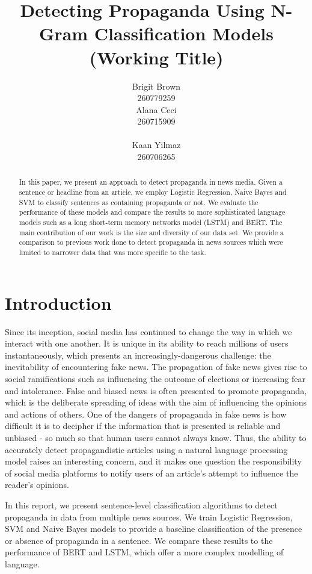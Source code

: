 \documentclass[11pt]{article}
\title{Detecting Propaganda Using N-Gram Classification Models (Working Title)}
\author{Brigit Brown \\
260779259 \\\And
 Alana Ceci \\
  260715909 \\
  \\\And
  Kaan Yilmaz \\
  260706265}
\date{}
\begin{document}
\maketitle
\begin{abstract}

In this paper, we present an approach to detect propaganda in news media. Given a sentence or headline from an article, we employ Logistic Regression, Naive Bayes and SVM to classify sentences as containing propaganda or not. We evaluate the performance of these models and compare the results to more sophisticated language models such as a long short-term memory networks model (LSTM) and BERT. The main contribution of our work is the size and diversity of our data set. We provide a comparison to previous work done to detect propaganda in news sources which were limited to narrower data that was more specific to the task. 
\end{abstract}

\section{Introduction}

Since its inception, social media has continued to change the way in which we interact with one another.  It is unique in its ability to reach millions of users instantaneously, which presents an increasingly-dangerous challenge: the inevitability of encountering fake news. The propagation of fake news gives rise to social ramifications such as influencing the outcome of elections or increasing fear and intolerance. False and biased news is often presented to promote propaganda, which is the deliberate spreading of ideas with the aim of influencing the opinions and actions of others. One of the dangers of propaganda in fake news is how difficult it is to decipher if the information that is presented is reliable and unbiased - so much so that human users cannot always know. Thus, the ability to accurately detect propagandistic articles using a natural language processing model raises an interesting concern, and it makes one question the responsibility of social media platforms to notify users of an article's attempt to influence the reader's opinions.

In this report, we present sentence-level classification algorithms to detect propaganda in data from multiple news sources. We train Logistic Regression, SVM and Naive Bayes models to provide a baseline classification of the presence or absence of propaganda in a sentence.  We compare these results to the performance of BERT and LSTM, which offer a more complex modelling of language. 
\end{document}

